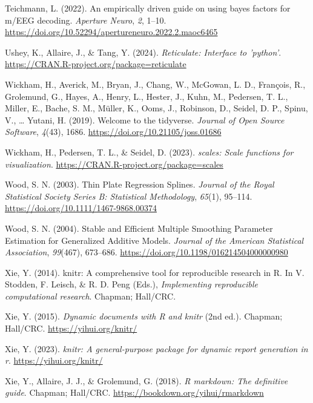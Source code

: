 \documentclass[
  doc,
  floatsintext,
  longtable,
  a4paper,
  nolmodern,
  notxfonts,
  notimes,
  colorlinks=true,linkcolor=blue,citecolor=blue,urlcolor=blue]{apa7}
\newlength{\cslhangindent}
\newenvironment{CSLReferences}[2] %
 {\begin{list}{}{%
  \setlength{\itemindent}{0pt}
  \setlength{\leftmargin}{0pt}
  \setlength{\parsep}{0pt}
  \ifodd #1
   \setlength{\leftmargin}{\cslhangindent}
   \setlength{\itemindent}{-1\cslhangindent}
  \fi
  \setlength{\itemsep}{#2\baselineskip}}}
 {\end{list}}
\begin{document}
\begin{CSLReferences}{1}{0}
Teichmann, L. (2022). An empirically driven guide on using bayes factors
for m/EEG decoding. \emph{Aperture Neuro}, \emph{2}, 1--10.
\url{https://doi.org/10.52294/apertureneuro.2022.2.maoc6465}

Ushey, K., Allaire, J., \& Tang, Y. (2024). \emph{Reticulate: Interface
to 'python'}. \url{https://CRAN.R-project.org/package=reticulate}

Wickham, H., Averick, M., Bryan, J., Chang, W., McGowan, L. D.,
François, R., Grolemund, G., Hayes, A., Henry, L., Hester, J., Kuhn, M.,
Pedersen, T. L., Miller, E., Bache, S. M., Müller, K., Ooms, J.,
Robinson, D., Seidel, D. P., Spinu, V., \ldots{} Yutani, H. (2019).
Welcome to the {tidyverse}. \emph{Journal of Open Source Software},
\emph{4}(43), 1686. \url{https://doi.org/10.21105/joss.01686}

Wickham, H., Pedersen, T. L., \& Seidel, D. (2023). \emph{{scales}:
Scale functions for visualization}.
\url{https://CRAN.R-project.org/package=scales}

Wood, S. N. (2003). Thin Plate Regression Splines. \emph{Journal of the
Royal Statistical Society Series B: Statistical Methodology},
\emph{65}(1), 95--114. \url{https://doi.org/10.1111/1467-9868.00374}

Wood, S. N. (2004). Stable and Efficient Multiple Smoothing Parameter
Estimation for Generalized Additive Models. \emph{Journal of the
American Statistical Association}, \emph{99}(467), 673--686.
\url{https://doi.org/10.1198/016214504000000980}

Xie, Y. (2014). {knitr}: A comprehensive tool for reproducible research
in {R}. In V. Stodden, F. Leisch, \& R. D. Peng (Eds.),
\emph{Implementing reproducible computational research}. Chapman;
Hall/CRC.

Xie, Y. (2015). \emph{Dynamic documents with {R} and knitr} (2nd ed.).
Chapman; Hall/CRC. \url{https://yihui.org/knitr/}

Xie, Y. (2023). \emph{{knitr}: A general-purpose package for dynamic
report generation in r}. \url{https://yihui.org/knitr/}

Xie, Y., Allaire, J. J., \& Grolemund, G. (2018). \emph{R markdown: The
definitive guide}. Chapman; Hall/CRC.
\url{https://bookdown.org/yihui/rmarkdown}


\end{CSLReferences}
\end{document}
